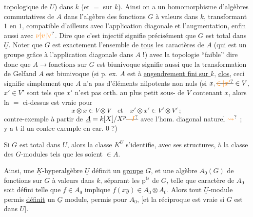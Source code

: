 topologique de $U$) dans $k$ (et $=$ sur $k$). Ainsi
on a un  homomorphisme d'algèbres
commutatives de $A$ dans l'algèbre des fonctions
 $G$ à valeurs dans $k$, transformant $1$ en $1$, compatible
d'ailleurs avec l'application diagonale et
l'augmentation, enfin aussi avec $\unsure{\nu|v|\vee}$. Dire que
c'est injectif signifie précisément que
$G$ est total dans $\underline U$. Noter que $G$ est exactement
l'ensemble de \uline{tous} les caractères de $A$
(qui est un groupe grâce à l'application
diagonale dans $A$ !) avec la topologie ``faible''
dire donc que $A\to\text{fonctions sur }G$ est
biunivoque signifie aussi que la transformation
de Gelfand  $A$ est biunivoque (si p. ex. $A$
est à \uline{engendrement fini sur $k$}, 
\uline{clos}, ceci signifie simplement que $A$ n'a pas
d'éléments nilpotents non nuls (si $x,\deleted{\unsure{\in|x'}}\in V$, $x'\in V'$
sont tels que $x'$ n'est pas orth. au plus
petit sous- de $V$ contenant $x$,
alors la $=$ ci-dessus est vraie pour
\[
x\otimes x\in V\otimes V\quad\text{et}\quad x'\otimes x'\in V'\otimes V'\,;
\]
contre-exemple  à partir de $\underline A=k[X]/X^p\deleted{\unsure{-I}}$
 avec l'hom. diagonal naturel $\unsure{\leadsto}$ ; y-a-t-il un
 contre-exemple en car. $0$ ?)

 Si $\underline G$ est total dans $\underline U$,  alors la classe $\underline K^{U}$ s'identifie,
avec  ses structures, à la classe des 
$G$-modules  tels que les  
 soient $\in A$.

Ainsi, une $\underline K$-hyperalgèbre $\underline U$ définit
un \uline{groupe} $G$, et une algèbre  $A_0(G)$ de fonctions
sur $G$ à valeurs dans $k$, séparant les $\mathrm{p}^{\mathrm{ts}}$ de $G$,
telle que  caractère  de $A_0$ soit défini
telle que $f\in A_0$ implique $f(xy)\in A_0\otimes A_0$. Alors
tout $\underline U$-module permis \uline{définit} un $\underline G$
module, permis pour $A_0$, [et la réciproque
est vraie si $G$ est   dans $U$].

